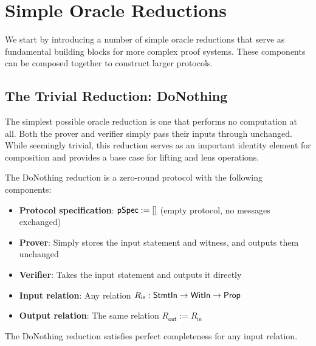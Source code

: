\section{Simple Oracle Reductions}

We start by introducing a number of simple oracle reductions that serve as fundamental building blocks for more complex proof systems. These components can be composed together to construct larger protocols.

\subsection{The Trivial Reduction: DoNothing}

The simplest possible oracle reduction is one that performs no computation at all. Both the prover and verifier simply pass their inputs through unchanged. While seemingly trivial, this reduction serves as an important identity element for composition and provides a base case for lifting and lens operations.

\begin{definition}
    \label{def:donothing_reduction}
    The DoNothing reduction is a zero-round protocol with the following components:
    \begin{itemize}
        \item \textbf{Protocol specification}: $\mathsf{pSpec} := []$ (empty protocol, no messages exchanged)
        \item \textbf{Prover}: Simply stores the input statement and witness, and outputs them unchanged
        \item \textbf{Verifier}: Takes the input statement and outputs it directly
        \item \textbf{Input relation}: Any relation $R_{\mathsf{in}} : \mathsf{StmtIn} \to \mathsf{WitIn} \to \mathsf{Prop}$
        \item \textbf{Output relation}: The same relation $R_{\mathsf{out}} := R_{\mathsf{in}}$
    \end{itemize}
\end{definition}

\begin{theorem}
    The DoNothing reduction satisfies perfect completeness for any input relation.
\end{theorem}

